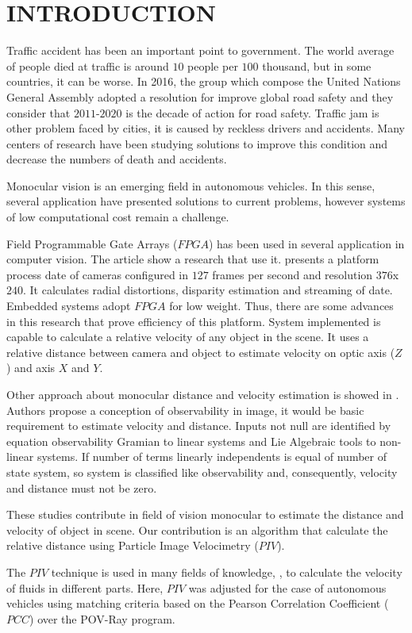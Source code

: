 \section{INTRODUCTION}

Traffic accident has been an important point to government. The world average of people
died at traffic is around $10$ people per $100$ thousand, but in some countries, it can be worse.
In 2016, the group which compose the United Nations General Assembly adopted a resolution for
improve global road safety and they consider that $2011$-$2020$ is the decade of action for road safety.
Traffic jam is other problem faced by cities, it is caused by reckless drivers and accidents.
Many centers of research have been studying solutions to improve this condition and decrease the 
numbers of death and accidents.

Monocular vision is an emerging field in autonomous vehicles. In this sense,
several application have presented solutions to current problems, 
however systems  of low computational cost remain a challenge.

Field Programmable Gate Arrays ($FPGA$) has been used in several application in computer vision. The article \cite{Honegger} 
show a research that use it. \cite{Honegger} presents a platform process date of 
cameras configured in $127$ frames per second and resolution $376$x$240$. It calculates radial distortions, disparity estimation
and streaming of date. Embedded systems adopt $FPGA$ for low weight. Thus, there are some advances in this research 
that prove efficiency of this platform. System implemented is capable to calculate a relative velocity of any object 
in the scene. It uses a relative distance between camera and object to estimate velocity on optic axis ($Z$) and axis $X$ and $Y$.

Other approach about monocular distance and velocity estimation is showed in \cite{Breugel}. Authors propose a conception of 
observability in image, it would be basic requirement to estimate velocity and distance. Inputs not null are identified by
equation observability Gramian to linear systems and Lie Algebraic tools to non-linear systems. If 
number of terms linearly independents is equal of number of state system, so system is classified like observability and, 
consequently, velocity and distance must not be zero.

These studies contribute in field of vision monocular to estimate the distance and velocity of object in scene. 
Our contribution is an algorithm that calculate the relative distance using Particle Image Velocimetry ($PIV$).


The $PIV$ \cite{Bastiaans} technique is used in many fields of 
knowledge, \cite{Story, Xu}, to calculate the velocity of fluids in different parts. 
Here, $PIV$ was adjusted for the case of autonomous vehicles using matching criteria based on 
the Pearson Correlation Coefficient ($PCC$)\cite{Miranda Neto} over the POV-Ray \cite{povray} program.


